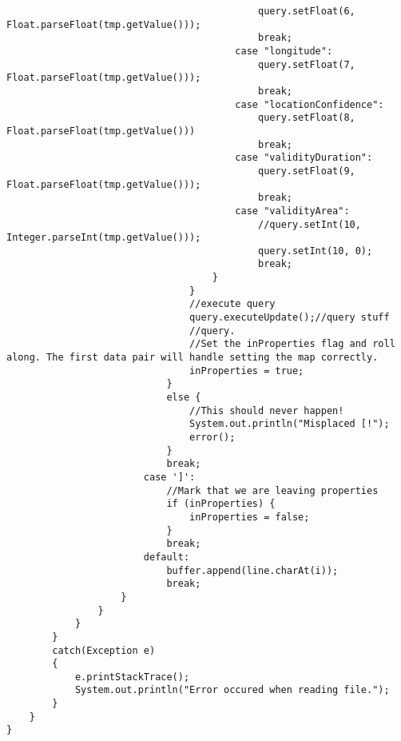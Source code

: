 \begin{lstlisting}
                                            query.setFloat(6, Float.parseFloat(tmp.getValue()));
                                            break;
                                        case "longitude":
                                            query.setFloat(7, Float.parseFloat(tmp.getValue()));
                                            break;
                                        case "locationConfidence":
                                            query.setFloat(8, Float.parseFloat(tmp.getValue()))
                                            break;
                                        case "validityDuration":
                                            query.setFloat(9, Float.parseFloat(tmp.getValue()));
                                            break;
                                        case "validityArea":
                                            //query.setInt(10, Integer.parseInt(tmp.getValue()));
                                            query.setInt(10, 0);
                                            break;
                                    }
                                }
                                //execute query
                                query.executeUpdate();//query stuff
                                //query.
                                //Set the inProperties flag and roll along. The first data pair will handle setting the map correctly.
                                inProperties = true;
                            }
                            else {
                                //This should never happen!
                                System.out.println("Misplaced [!");
                                error();
                            }
                            break;
                        case ']':
                            //Mark that we are leaving properties
                            if (inProperties) {
                                inProperties = false;
                            }
                            break;
                        default:
                            buffer.append(line.charAt(i));
                            break;
                    }
                }
            }
        }
        catch(Exception e)
        {
            e.printStackTrace();
            System.out.println("Error occured when reading file.");
        }
    }
}

\end{lstlisting}

